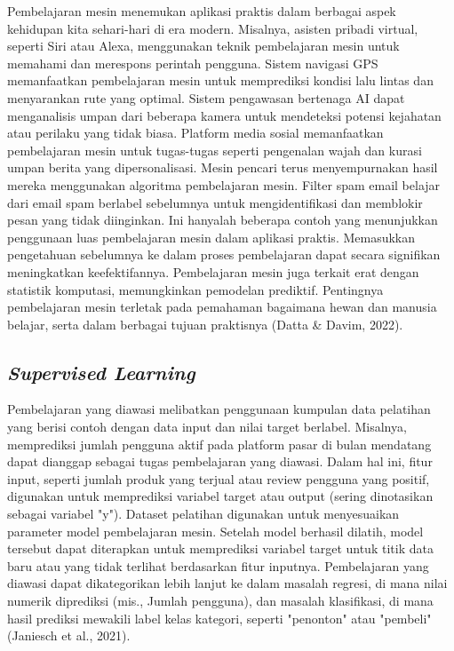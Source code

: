 Pembelajaran mesin menemukan aplikasi praktis dalam berbagai aspek kehidupan kita sehari-hari di era modern. Misalnya, asisten pribadi virtual, seperti Siri atau Alexa, menggunakan teknik pembelajaran mesin untuk memahami dan merespons perintah pengguna. Sistem navigasi GPS memanfaatkan pembelajaran mesin untuk memprediksi kondisi lalu lintas dan menyarankan rute yang optimal. Sistem pengawasan bertenaga AI dapat menganalisis umpan dari beberapa kamera untuk mendeteksi potensi kejahatan atau perilaku yang tidak biasa. Platform media sosial memanfaatkan pembelajaran mesin untuk tugas-tugas seperti pengenalan wajah dan kurasi umpan berita yang dipersonalisasi. Mesin pencari terus menyempurnakan hasil mereka menggunakan algoritma pembelajaran mesin. Filter spam email belajar dari email spam berlabel sebelumnya untuk mengidentifikasi dan memblokir pesan yang tidak diinginkan. Ini hanyalah beberapa contoh yang menunjukkan penggunaan luas pembelajaran mesin dalam aplikasi praktis. Memasukkan pengetahuan sebelumnya ke dalam proses pembelajaran dapat secara signifikan meningkatkan keefektifannya. Pembelajaran mesin juga terkait erat dengan statistik komputasi, memungkinkan pemodelan prediktif. Pentingnya pembelajaran mesin terletak pada pemahaman bagaimana hewan dan manusia belajar, serta dalam berbagai tujuan praktisnya (Datta \& Davim, 2022).

\subsection{\emph{Supervised Learning}}
\label{subsec:supervisedlearning}

Pembelajaran yang diawasi melibatkan penggunaan kumpulan data pelatihan yang berisi contoh dengan data input dan nilai target berlabel. Misalnya, memprediksi jumlah pengguna aktif pada platform pasar di bulan mendatang dapat dianggap sebagai tugas pembelajaran yang diawasi. Dalam hal ini, fitur input, seperti jumlah produk yang terjual atau review pengguna yang positif, digunakan untuk memprediksi variabel target atau output (sering dinotasikan sebagai variabel "y"). Dataset pelatihan digunakan untuk menyesuaikan parameter model pembelajaran mesin. Setelah model berhasil dilatih, model tersebut dapat diterapkan untuk memprediksi variabel target untuk titik data baru atau yang tidak terlihat berdasarkan fitur inputnya. Pembelajaran yang diawasi dapat dikategorikan lebih lanjut ke dalam masalah regresi, di mana nilai numerik diprediksi (mis., Jumlah pengguna), dan masalah klasifikasi, di mana hasil prediksi mewakili label kelas kategori, seperti "penonton" atau "pembeli" (Janiesch et al., 2021).

